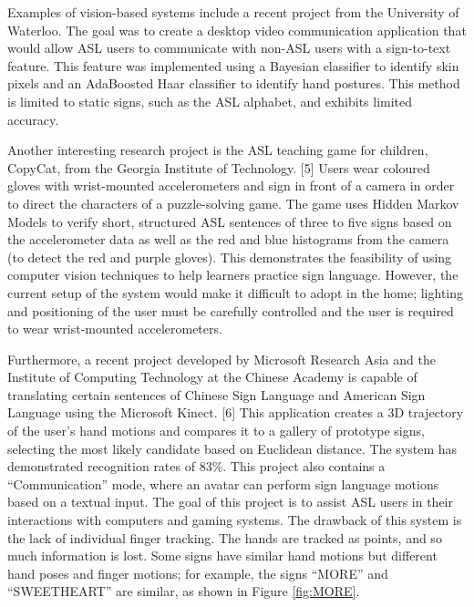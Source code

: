 \documentclass[12pt]{article}
\begin{document}
Examples of vision-based systems include a recent project from the University of Waterloo. The goal was to create a desktop video communication application that would allow ASL users to communicate with non-ASL users with a sign-to-text feature. This feature was implemented using a Bayesian classifier to identify skin pixels and an AdaBoosted Haar classifier to identify hand postures. This method is limited to static signs, such as the ASL alphabet, and exhibits limited accuracy.

Another interesting research project is the ASL teaching game for children, CopyCat, from the Georgia Institute of Technology. [5] Users wear coloured gloves with wrist-mounted accelerometers and sign in front of a camera in order to direct the characters of a puzzle-solving game. The game uses Hidden Markov Models to verify short, structured ASL sentences of three to five signs based on the accelerometer data as well as the red and blue histograms from the camera (to detect the red and purple gloves). This demonstrates the feasibility of using computer vision techniques to help learners practice sign language. However, the current setup of the system would make it difficult to adopt in the home; lighting and positioning of the user must be carefully controlled and the user is required to wear wrist-mounted accelerometers. 

Furthermore, a recent project developed by Microsoft Research Asia and the Institute of Computing Technology at the Chinese Academy is capable of translating certain sentences of Chinese Sign Language and American Sign Language using the Microsoft Kinect. [6] This application creates a 3D trajectory of the user’s hand motions and compares it to a gallery of prototype signs, selecting the most likely candidate based on Euclidean distance. The system has demonstrated recognition rates of 83\%. This project also contains a “Communication” mode, where an avatar can perform sign language motions based on a textual input. The goal of this project is to assist ASL users in their interactions with computers and gaming systems. The drawback of this system is the lack of individual finger tracking. The hands are tracked as points, and so much information is lost. Some signs have similar hand motions but different hand poses and finger motions; for example, the signs “MORE” and “SWEETHEART” are similar, as shown in Figure \ref{fig:MORE}. 
\end{document}
